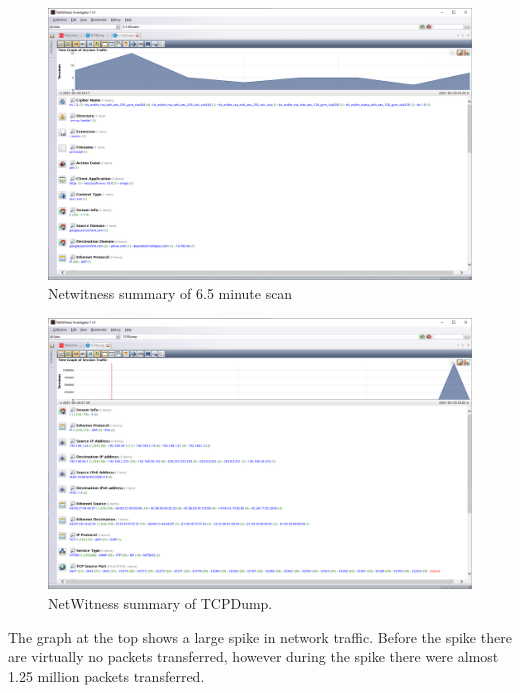 \begin{figure}[H]
    \centering
    \includegraphics[width=\linewidth]{figures/6.5minutes_netwitness.png}
    \caption{Netwitness summary of 6.5 minute scan}
    \label{fig:netwit6}
\end{figure}

\begin{figure}[H]
    \centering
    \includegraphics[width=\linewidth]{figures/tcpdump_netWitness.png}
    \caption{NetWitness summary of TCPDump.}
    \label{fig:netwitTCP}
\end{figure}
The graph at the top shows a large spike in network traffic.
Before the spike there are virtually no packets transferred, however during the spike there were almost 1.25 million packets transferred.


